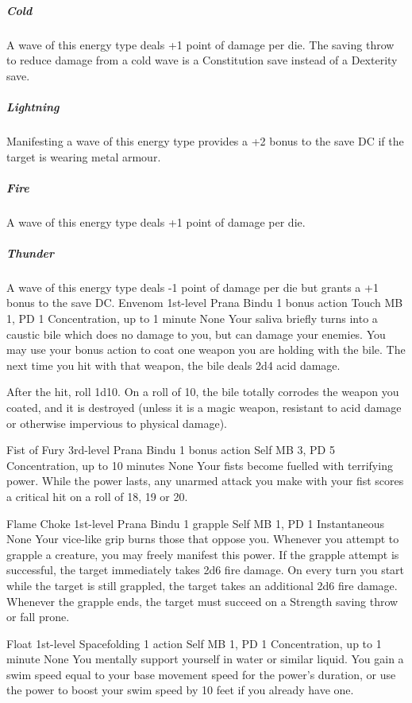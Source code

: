 \subparagraph{Cold}
A wave of this energy type deals +1 point
of damage per die.
The saving throw to reduce damage from a cold wave
is a Constitution save instead of a Dexterity save.  

\subparagraph{Lightning}
Manifesting a wave of this energy type
provides a +2 bonus to the save DC if the target is wearing
metal armour.

\subparagraph{Fire}
A wave of this energy type deals +1 point of damage per die.

\subparagraph{Thunder}
A wave of this energy type deals -1 point of damage per die
but grants a +1 bonus to the save DC.
\DndPowerHeader%
    {Envenom\label{pwr:envenom}}
    {1st-level Prana Bindu}
    {1 bonus action}
    {Touch}
    {MB 1, PD 1}
    {Concentration, up to 1 minute}
    {None}
Your saliva briefly turns into a caustic
bile which does no damage to you, but can damage your enemies.
You may use your bonus action to coat one weapon you are holding
with the bile. The next time you hit with that weapon, the
bile deals 2d4 acid damage.

After the hit, roll 1d10. On a roll of 10, the bile totally
corrodes the weapon you coated, and it is destroyed (unless
it is a magic weapon, resistant to acid damage or otherwise
impervious to physical damage).

\DndPowerHeader%
    {Fist of Fury\label{pwr:fist-of-fury}}
    {3rd-level Prana Bindu}
    {1 bonus action}
    {Self}
    {MB 3, PD 5}
    {Concentration, up to 10 minutes}
    {None}
Your fists become fuelled with terrifying
power. While the power lasts, any unarmed attack you make
with your fist scores a critical hit on a roll of 18, 19 or
20.

\DndPowerHeader%
    {Flame Choke\label{pwr:flame-choke}}
    {1st-level Prana Bindu}
    {1 grapple}
    {Self}
    {MB 1, PD 1}
    {Instantaneous}
    {None}
Your vice-like grip burns those that oppose
you. Whenever you attempt to grapple a creature, you may freely
manifest this power. If the grapple attempt
is successful, the target immediately takes 2d6 fire damage.
On every turn you start while the target is still grappled,
the target takes an additional 2d6 fire damage. Whenever the
grapple ends, the target must succeed on a Strength saving
throw or fall prone.

\DndPowerHeader%
    {Float\label{pwr:float}}
    {1st-level Spacefolding}
    {1 action}
    {Self}
    {MB 1, PD 1}
    {Concentration, up to 1 minute}
    {None}
You mentally support yourself in water or
similar liquid. You gain a swim speed equal to your base movement
speed for the power's duration, or use the power to boost
your swim speed by 10 feet if you already have one.

